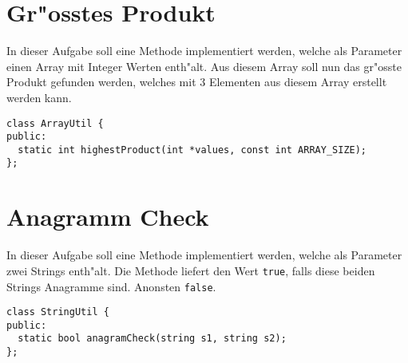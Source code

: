 \documentclass[a4paper,10pt]{article}
\begin{document}
\section{Gr"osstes Produkt}
In dieser Aufgabe soll eine Methode implementiert werden, welche als Parameter einen Array mit Integer Werten
enth"alt. Aus diesem Array soll nun das gr"osste Produkt gefunden werden, welches mit 3 Elementen aus diesem
Array erstellt werden kann.

\vspace{3mm}

\begin{lstlisting}
class ArrayUtil {
public:
  static int highestProduct(int *values, const int ARRAY_SIZE);
};
\end{lstlisting}

\section{Anagramm Check}
In dieser Aufgabe soll eine Methode implementiert werden, welche als Parameter zwei Strings enth"alt.
Die Methode liefert den Wert \verb|true|, falls diese beiden Strings Anagramme sind. Anonsten \verb|false|.

\begin{lstlisting}
class StringUtil {
public:
  static bool anagramCheck(string s1, string s2);
};
\end{lstlisting}
\end{document}
